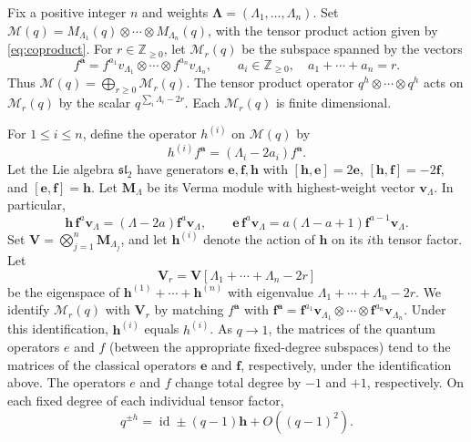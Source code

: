 \documentclass[12pt]{amsart}
\let\frak\mathfrak
\def\vsk#1>{\vskip#1\baselineskip}
\theoremstyle{definition}
\numberwithin{equation}{section}
\theoremstyle{definition}
\let\mc\mathcal
\let\La\Lambda
\let\ox\otimes
\let\ge\geqslant
\let\le\leqslant
\let\on\operatorname
\let\bs\boldsymbol
\def\Z{{\mathbb Z}}
\def\id{\on{id}}
\def\beq{\begin{equation}}
\def\eeq{\end{equation}}
\def\slt{{\frak{sl}_2}}
\begin{document}
Fix a positive integer $n$ and weights $\bs\La=(\La_1,\ldots,\La_n)$.
Set $\mc M(q)=M_{\La_1}(q)\ox\cdots\ox M_{\La_n}(q)$,
with the tensor product action given by \eqref{eq:coproduct}.
For $r\in\Z_{\ge0}$, let $\mc M_r(q)$ be the subspace
spanned by the vectors
\beq\label{eq:basis}
 f^{\mathbf a}=f^{a_1}v_{\La_1}\ox\cdots\ox
 f^{a_n}v_{\La_n},\qquad
 a_i\in\Z_{\ge0},\quad a_1+\cdots+a_n=r.
\eeq
Thus $\mc M(q)=\bigoplus_{r\ge0}\mc M_r(q)$.
The tensor product operator $q^h\ox\cdots\ox q^h$
acts on $\mc M_r(q)$ by the scalar $q^{\sum_i\La_i-2r}$.
Each $\mc M_r(q)$ is finite dimensional.

For $1\le i\le n$, define the operator $h^{(i)}$
on $\mc M(q)$ by
\beq\label{eq:hi}
 h^{(i)}f^{\mathbf a}=(\La_i-2a_i)f^{\mathbf a}.
\eeq
\vsk1>
Let the Lie algebra $\slt$ have generators $\mathbf e,\mathbf f,\mathbf h$ with
$[\mathbf h,\mathbf e]=2\mathbf e$,
$[\mathbf h,\mathbf f]=-2\mathbf f$, and
$[\mathbf e,\mathbf f]=\mathbf h$.
Let $\mathbf M_\La$ be its Verma module with highest-weight
vector $\mathbf v_\La$.  In particular,
\[
 \mathbf h\,\mathbf f^a\mathbf v_\La
 =(\La-2a)\mathbf f^a\mathbf v_\La,
 \qquad
 \mathbf e\,\mathbf f^a\mathbf v_\La
 =a(\La-a+1)\mathbf f^{a-1}\mathbf v_\La.
\]
Set $\mathbf V=\bigotimes_{j=1}^n\mathbf M_{\La_j}$, and let
$\mathbf h^{(i)}$ denote the action of $\mathbf h$ on its
$i$th tensor factor.  Let
\[
 \mathbf V_r=\mathbf V[\La_1+\cdots+\La_n-2r]
\]
be the eigenspace of $\mathbf h^{(1)}+\cdots+\mathbf h^{(n)}$
with eigenvalue $\La_1+\cdots+\La_n-2r$.
We identify $\mc M_r(q)$ with $\mathbf V_r$ by matching
$f^{\mathbf a}$ with
$\mathbf f^{\mathbf a}
 =\mathbf f^{a_1}\mathbf v_{\La_1}\ox\cdots\ox
 \mathbf f^{a_n}\mathbf v_{\La_n}$.
Under this identification, $\mathbf h^{(i)}$ equals $h^{(i)}$.
As $q\to1$, the matrices of the quantum operators $e$ and $f$
(between the appropriate fixed-degree subspaces) tend to the
matrices of the classical operators $\mathbf e$ and $\mathbf f$,
respectively, under the identification above.  The operators
$e$ and $f$ change total degree by $-1$ and $+1$, respectively.
On each fixed degree of each individual tensor factor,
\[
 q^{\pm h}=\id\pm(q-1)\mathbf h+O((q-1)^2).
\]
\end{document}
